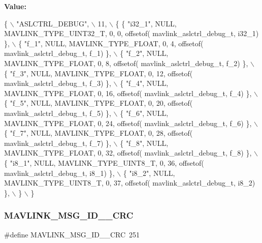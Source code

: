 {\bfseries Value\+:}
\begin{DoxyCode}
\{ \(\backslash\)
    \textcolor{stringliteral}{"ASLCTRL\_DEBUG"}, \(\backslash\)
    11, \(\backslash\)
    \{  \{ \textcolor{stringliteral}{"i32\_1"}, NULL, MAVLINK_TYPE_UINT32_T, 0, 0, offsetof(
      mavlink_aslctrl_debug_t, i32\_1) \}, \(\backslash\)
         \{ \textcolor{stringliteral}{"f\_1"}, NULL, MAVLINK_TYPE_FLOAT, 0, 4, offsetof(
      mavlink_aslctrl_debug_t, f\_1) \}, \(\backslash\)
         \{ \textcolor{stringliteral}{"f\_2"}, NULL, MAVLINK_TYPE_FLOAT, 0, 8, offsetof(
      mavlink_aslctrl_debug_t, f\_2) \}, \(\backslash\)
         \{ \textcolor{stringliteral}{"f\_3"}, NULL, MAVLINK_TYPE_FLOAT, 0, 12, offsetof(
      mavlink_aslctrl_debug_t, f\_3) \}, \(\backslash\)
         \{ \textcolor{stringliteral}{"f\_4"}, NULL, MAVLINK_TYPE_FLOAT, 0, 16, offsetof(
      mavlink_aslctrl_debug_t, f\_4) \}, \(\backslash\)
         \{ \textcolor{stringliteral}{"f\_5"}, NULL, MAVLINK_TYPE_FLOAT, 0, 20, offsetof(
      mavlink_aslctrl_debug_t, f\_5) \}, \(\backslash\)
         \{ \textcolor{stringliteral}{"f\_6"}, NULL, MAVLINK_TYPE_FLOAT, 0, 24, offsetof(
      mavlink_aslctrl_debug_t, f\_6) \}, \(\backslash\)
         \{ \textcolor{stringliteral}{"f\_7"}, NULL, MAVLINK_TYPE_FLOAT, 0, 28, offsetof(
      mavlink_aslctrl_debug_t, f\_7) \}, \(\backslash\)
         \{ \textcolor{stringliteral}{"f\_8"}, NULL, MAVLINK_TYPE_FLOAT, 0, 32, offsetof(
      mavlink_aslctrl_debug_t, f\_8) \}, \(\backslash\)
         \{ \textcolor{stringliteral}{"i8\_1"}, NULL, MAVLINK_TYPE_UINT8_T, 0, 36, offsetof(
      mavlink_aslctrl_debug_t, i8\_1) \}, \(\backslash\)
         \{ \textcolor{stringliteral}{"i8\_2"}, NULL, MAVLINK_TYPE_UINT8_T, 0, 37, offsetof(
      mavlink_aslctrl_debug_t, i8\_2) \}, \(\backslash\)
         \} \(\backslash\)
\}
\end{DoxyCode}
\mbox{\label{mavlink__msg__aslctrl__debug_8h_a531653be928e23ae66835eac1f47408b}} 
\subsubsection{M\+A\+V\+L\+I\+N\+K\+\_\+\+M\+S\+G\+\_\+\+I\+D\+\_\+\_\+\+C\+RC}
{\footnotesize\ttfamily \#define M\+A\+V\+L\+I\+N\+K\+\_\+\+M\+S\+G\+\_\+\+I\+D\+\_\+\_\+\+C\+RC~251}

